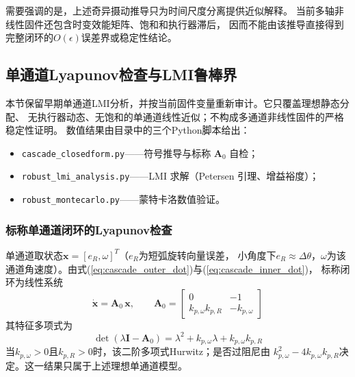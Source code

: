 需要强调的是，上述奇异摄动推导只为时间尺度分离提供近似解释。
当前多轴非线性固件还包含时变效能矩阵、饱和和执行器滞后，
因而不能由该推导直接得到完整闭环的$O(\epsilon)$误差界或稳定性结论。

\subsection{单通道Lyapunov检查与LMI鲁棒界}
\label{sec:cascade_lmi}

本节保留早期单通道LMI分析，并按当前固件变量重新审计。它只覆盖理想静态分配、
无执行器动态、无饱和的单通道线性近似；不构成多通道非线性固件的严格稳定性证明。
数值结果由目录中的三个Python脚本给出：
\begin{itemize}
  \item \texttt{cascade\_closedform.py}——符号推导与标称 $\mathbf{A}_0$ 自检；
  \item \texttt{robust\_lmi\_analysis.py}——LMI 求解（Petersen 引理、增益裕度）；
  \item \texttt{robust\_montecarlo.py}——蒙特卡洛数值验证。
\end{itemize}

\subsubsection{标称单通道闭环的Lyapunov检查}

单通道取状态$\mathbf{x}=[e_R,\omega]^T$（$e_R$为短弧旋转向量误差，
小角度下$e_R\approx\Delta\theta$，$\omega$为该通道角速度）。由式(\ref{eq:cascade_outer_dot})与(\ref{eq:cascade_inner_dot})，
标称闭环为线性系统
\begin{equation}
    \dot{\mathbf{x}} = \mathbf{A}_0\,\mathbf{x},\qquad
    \mathbf{A}_0 = \begin{bmatrix} 0 & -1 \\[2pt] k_{p,\omega}k_{p,R} & -k_{p,\omega} \end{bmatrix}
    \label{eq:cascade_A0}
\end{equation}
其特征多项式为
\begin{equation}
    \det(\lambda\mathbf{I}-\mathbf{A}_0)
    = \lambda^2+k_{p,\omega}\lambda+k_{p,\omega}k_{p,R}
    \label{eq:cascade_charpoly}
\end{equation}
当$k_{p,\omega}>0$且$k_{p,R}>0$时，该二阶多项式Hurwitz；是否过阻尼由
$k_{p,\omega}^2-4k_{p,\omega}k_{p,R}$决定。这一结果只属于上述理想单通道模型。

